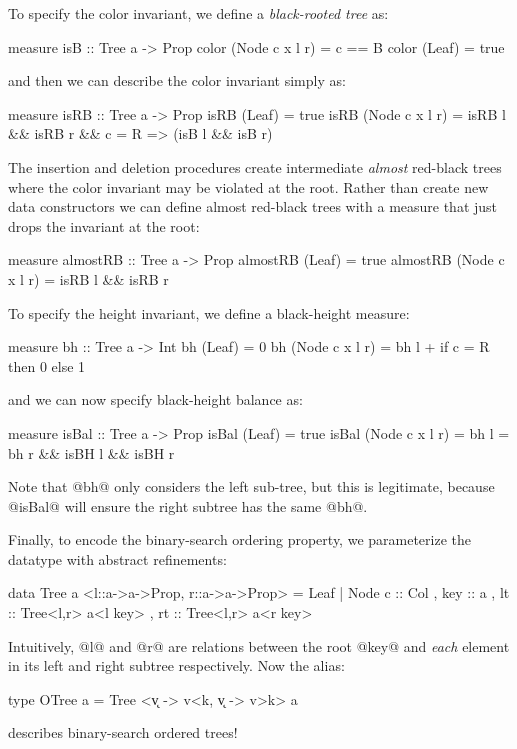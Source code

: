 To specify the color invariant, we define a \emph{black-rooted tree} as:
%
\begin{code}
  measure isB           :: Tree a -> Prop 
  color (Node c x l r)  = c == B
  color (Leaf)          = true
\end{code}
%
and then we can describe the color invariant simply as:
%
\begin{code}
  measure isRB        :: Tree a -> Prop
  isRB (Leaf)         = true
  isRB (Node c x l r) = isRB l && isRB r &&
                        c = R => (isB l && isB r)
\end{code}
%
The insertion and deletion procedures create intermediate \emph{almost} 
red-black trees where the color invariant may be violated at the root. 
Rather than create new data constructors we can define almost red-black 
trees with a measure that just drops the invariant at the root:
%
\begin{code}
  measure almostRB        :: Tree a -> Prop
  almostRB (Leaf)         = true
  almostRB (Node c x l r) = isRB l && isRB r
\end{code}

To specify the height invariant, we define a black-height measure:
%
\begin{code}
  measure bh        :: Tree a -> Int
  bh (Leaf)         = 0
  bh (Node c x l r) = bh l 
                    + if c = R then 0 else 1
\end{code}
%
and we can now specify black-height balance as:
%
\begin{code}
  measure isBal        :: Tree a -> Prop
  isBal (Leaf)         = true
  isBal (Node c x l r) = bh l = bh r 
                       && isBH l && isBH r 
\end{code}
%
Note that @bh@ only considers the left sub-tree, 
but this is legitimate, because @isBal@ will 
ensure the right subtree has the same @bh@.

Finally, to encode the binary-search ordering property, we parameterize 
the datatype with abstract refinements:
%
\begin{code}
  data Tree a <l::a->a->Prop, r::a->a->Prop>
    = Leaf
    | Node { c   :: Col
           , key :: a
           , lt  :: Tree<l,r> a<l key>
           , rt  :: Tree<l,r> a<r key> }
\end{code}
%
Intuitively, @l@ and @r@ are relations between the root @key@ 
and \emph{each} element in its left and right subtree respectively.
Now the alias:
%
\begin{code}
  type OTree a 
    = Tree <{\k v -> v<k}, {\k v -> v>k}> a
\end{code}
%
describes binary-search ordered trees!

